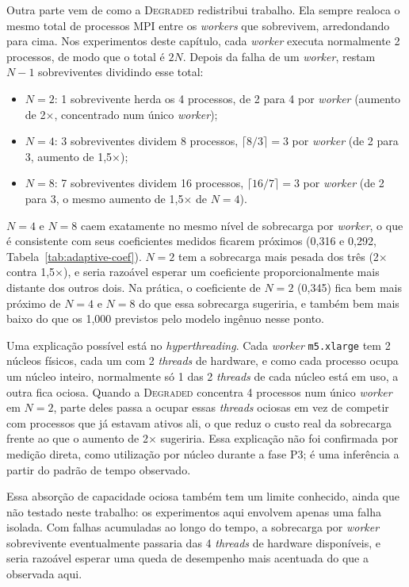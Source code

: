 Outra parte vem de como a \textsc{Degraded} redistribui trabalho. Ela sempre realoca
o mesmo total de processos MPI entre os \textit{workers} que sobrevivem, arredondando
para cima. Nos experimentos deste capítulo, cada \textit{worker} executa normalmente
2 processos, de modo que o total é $2N$. Depois da falha de um \textit{worker},
restam $N-1$ sobreviventes dividindo esse total:
\begin{itemize}
  \item $N=2$: 1 sobrevivente herda os 4 processos, de 2 para 4 por \textit{worker}
    (aumento de 2$\times$, concentrado num único \textit{worker});
  \item $N=4$: 3 sobreviventes dividem 8 processos, $\lceil 8/3 \rceil = 3$ por
    \textit{worker} (de 2 para 3, aumento de 1,5$\times$);
  \item $N=8$: 7 sobreviventes dividem 16 processos, $\lceil 16/7 \rceil = 3$ por
    \textit{worker} (de 2 para 3, o mesmo aumento de 1,5$\times$ de $N=4$).
\end{itemize}
$N=4$ e $N=8$ caem exatamente no mesmo nível de sobrecarga por \textit{worker}, o que
é consistente com seus coeficientes medidos ficarem próximos (0,316 e 0,292,
Tabela~\ref{tab:adaptive-coef}). $N=2$ tem a sobrecarga mais pesada dos três
(2$\times$ contra 1,5$\times$), e seria razoável esperar um coeficiente
proporcionalmente mais distante dos outros dois. Na prática, o coeficiente de $N=2$
(0,345) fica bem mais próximo de $N=4$ e $N=8$ do que essa sobrecarga sugeriria, e
também bem mais baixo do que os 1,000 previstos pelo modelo ingênuo nesse ponto.

Uma explicação possível está no \textit{hyperthreading}. Cada \textit{worker}
\texttt{m5.xlarge} tem 2 núcleos físicos, cada um com 2 \textit{threads} de hardware,
e como cada processo ocupa um núcleo inteiro, normalmente só 1 das 2 \textit{threads}
de cada núcleo está em uso, a outra fica ociosa. Quando a \textsc{Degraded} concentra
4 processos num único \textit{worker} em $N=2$, parte deles passa a ocupar essas
\textit{threads} ociosas em vez de competir com processos que já estavam ativos ali,
o que reduz o custo real da sobrecarga frente ao que o aumento de 2$\times$
sugeriria. Essa explicação não foi confirmada por medição direta, como utilização
por núcleo durante a fase P3; é uma inferência a partir do padrão de tempo observado.

Essa absorção de capacidade ociosa também tem um limite conhecido, ainda que não
testado neste trabalho: os experimentos aqui envolvem apenas uma falha isolada. Com
falhas acumuladas ao longo do tempo, a sobrecarga por \textit{worker} sobrevivente
eventualmente passaria das 4 \textit{threads} de hardware disponíveis, e seria
razoável esperar uma queda de desempenho mais acentuada do que a observada aqui.


